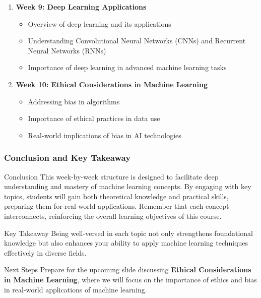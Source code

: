 \documentclass[aspectratio=169]{beamer}
\begin{document}
\begin{frame}
\begin{enumerate}
        \item \textbf{Week 9: Deep Learning Applications}
            \begin{itemize}
                \item Overview of deep learning and its applications
                \item Understanding Convolutional Neural Networks (CNNs) and Recurrent Neural Networks (RNNs)
                \item Importance of deep learning in advanced machine learning tasks
            \end{itemize}

        \item \textbf{Week 10: Ethical Considerations in Machine Learning}
            \begin{itemize}
                \item Addressing bias in algorithms
                \item Importance of ethical practices in data use
                \item Real-world implications of bias in AI technologies
            \end{itemize}
    \end{enumerate}
\end{frame}

\begin{frame}
    \frametitle{Conclusion and Key Takeaway}
    \begin{block}{Conclusion}
        This week-by-week structure is designed to facilitate deep understanding and mastery of machine learning concepts. 
        By engaging with key topics, students will gain both theoretical knowledge and practical skills, preparing them 
        for real-world applications. Remember that each concept interconnects, reinforcing the overall learning objectives 
        of this course.
    \end{block}

    \begin{block}{Key Takeaway}
        Being well-versed in each topic not only strengthens foundational knowledge but also enhances your ability to 
        apply machine learning techniques effectively in diverse fields.
    \end{block}

    \begin{block}{Next Steps}
        Prepare for the upcoming slide discussing \textbf{Ethical Considerations in Machine Learning}, 
        where we will focus on the importance of ethics and bias in real-world applications of machine learning.
    \end{block}
\end{frame}
\end{document}
